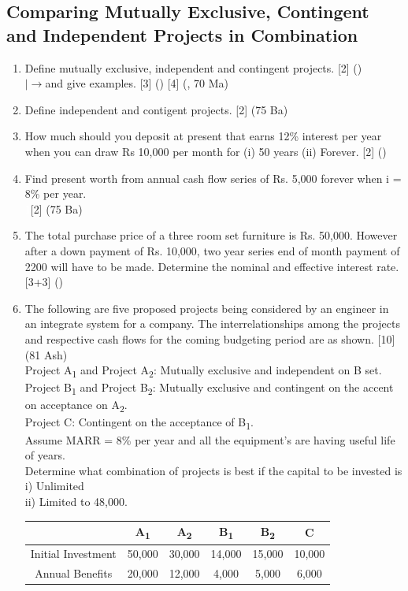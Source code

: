\documentclass[12pt]{article}
\newcommand{\lb}{\\ $\left|\rightarrow\right.$}
\newcommand{\enter}{\\\textcolor{white}{1}}
\newcommand{\sub}[1]{\textsubscript{#1}}
\begin{document}
	\subsection{Comparing Mutually Exclusive, Contingent and Independent Projects in Combination}
	\begin{enumerate}[noitemsep, topsep = 0pt]
		\item Define mutually exclusive, independent and contingent projects. \hfill [2] ()
		\lb and give examples. \hfill [3] () [4] (, 70 Ma)
		
		\item Define independent and contigent projects. \hfill [2] (75 Ba)
		
		\item How much should you deposit at present that earns 12\% interest per year when you can draw Rs 10,000 per month for (i) 50 years (ii) Forever. \hfill [2] ()
		
		\item Find present worth from annual cash flow series of Rs. 5,000 forever when i = 8\% per year.
		\enter\hfill [2] (75 Ba)
		
		\item The total purchase price of a three room set furniture is Rs. 50,000. However after a down payment of Rs. 10,000, two year series end of month payment of 2200 will have to be made. Determine the nominal and effective interest rate. \hfill [3+3] ()
		
		\item The following are five proposed projects being considered by an engineer in an integrate system for a company. The interrelationships among the projects and respective cash flows for the coming budgeting period are as shown. \hfill [10] (81 Ash)\\
		Project A\sub{1} and Project A\sub{2}: Mutually exclusive and independent on B set.\\
		Project B\sub{1} and Project B\sub{2}: Mutually exclusive and contingent on the accent on acceptance on A\sub{2}.\\
		Project C: Contingent on the acceptance of B\sub{1}.\\
		Assume MARR = 8\% per year and all the equipment's are having useful life of years.\\
		Determine what combination of projects is best if the capital to be invested is\\
		i) Unlimited\\
		ii) Limited to 48,000.\\
		\begin{tabular}{|c|c|c|c|c|c|}
			\hline
			& A\sub{1} & A\sub{2} & B\sub{1} & B\sub{2} & C \\ \hline
			Initial Investment & 50,000 & 30,000 & 14,000 & 15,000 & 10,000 \\ \hline
			Annual Benefits & 20,000 & 12,000 & 4,000 & 5,000 & 6,000 \\ \hline
		\end{tabular}\\[0pt]
		

\end{enumerate}
\end{document}
